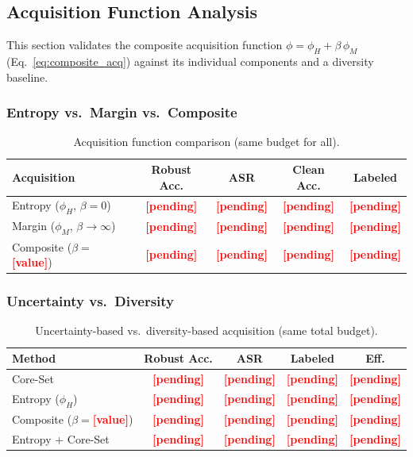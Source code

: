\documentclass[review,1p,times,number]{elsarticle}
\newcommand{\TODO}[1]{\textcolor{red}{\textbf{[#1]}}}
\begin{document}
\subsection{Acquisition Function Analysis}
\label{sec:acquisition}

This section validates the composite acquisition function
$\phi = \phi_H + \beta\,\phi_M$ (Eq.~\ref{eq:composite_acq})
against its individual components and a diversity baseline.

\subsubsection{Entropy vs.\ Margin vs.\ Composite}

\begin{table}[htbp]
\caption{Acquisition function comparison (same budget for all).}
\label{tab:acquisition}
\centering
\begin{tabular}{@{}lcccc@{}}
\toprule
\textbf{Acquisition} & \textbf{Robust Acc.} & \textbf{ASR}
  & \textbf{Clean Acc.} & \textbf{Labeled} \\
\midrule
Entropy ($\phi_H$, $\beta{=}0$)
  & \TODO{pending} & \TODO{pending} & \TODO{pending} & \TODO{pending} \\
Margin ($\phi_M$, $\beta{\to}\infty$)
  & \TODO{pending} & \TODO{pending} & \TODO{pending} & \TODO{pending} \\
Composite ($\beta{=}$\TODO{value})
  & \TODO{pending} & \TODO{pending} & \TODO{pending} & \TODO{pending} \\
\bottomrule
\end{tabular}
\end{table}

\subsubsection{Uncertainty vs.\ Diversity}

\begin{table}[htbp]
\caption{Uncertainty-based vs.\ diversity-based acquisition
  (same total budget).}
\label{tab:diversity}
\centering
\begin{tabular}{@{}lcccc@{}}
\toprule
\textbf{Method} & \textbf{Robust Acc.} & \textbf{ASR}
  & \textbf{Labeled} & \textbf{Eff.} \\
\midrule
Core-Set~\cite{sener2018active}
  & \TODO{pending} & \TODO{pending} & \TODO{pending} & \TODO{pending} \\
Entropy ($\phi_H$)
  & \TODO{pending} & \TODO{pending} & \TODO{pending} & \TODO{pending} \\
Composite ($\beta{=}$\TODO{value})
  & \TODO{pending} & \TODO{pending} & \TODO{pending} & \TODO{pending} \\
Entropy + Core-Set
  & \TODO{pending} & \TODO{pending} & \TODO{pending} & \TODO{pending} \\
\bottomrule
\end{tabular}
\end{table}
\end{document}
